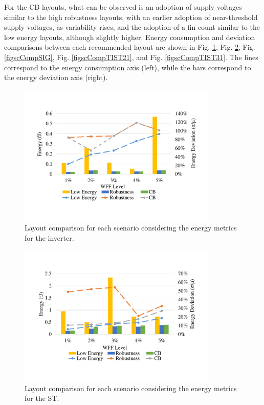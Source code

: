 \documentclass[diss,pgmicro,english]{iiufrgs}
\begin{document}
For the CB layouts, what can be observed is an adoption of supply voltages similar to the high robustness layouts, with an earlier adoption of near-threshold supply voltages, as variability rises, and the adoption of a fin count similar to the low energy layouts, although slightly higher. Energy consumption and deviation comparisons between each recommended layout are shown in Fig. \ref{figscCompINV}, Fig. \ref{figscCompST}, Fig. \ref{figscCompSIG}, Fig. \ref{figscCompTIST21}, and Fig. \ref{figscCompTIST31}. The lines correspond to the energy consumption axis (left), while the bars correspond to the energy deviation axis (right).

    \begin{figure}[H]
        \centering
        	\caption{Layout comparison for each scenario considering the energy metrics for the inverter.\label{figscCompINV}}
        	\includegraphics[width=0.85\textwidth, trim={1.25cm 2cm 2cm 3cm}, clip]{comp3Linv2Energy.pdf}
   \end{figure}

\begin{figure}[t]
     \centering
            \includegraphics[width=0.85\textwidth, trim={1.25cm 3cm 2cm 3cm}, clip]{comp3Lst2Energy.pdf}
            \caption{Layout comparison for each scenario considering the energy metrics for the ST.\label{figscCompST}}
    \end{figure}
\end{document}
